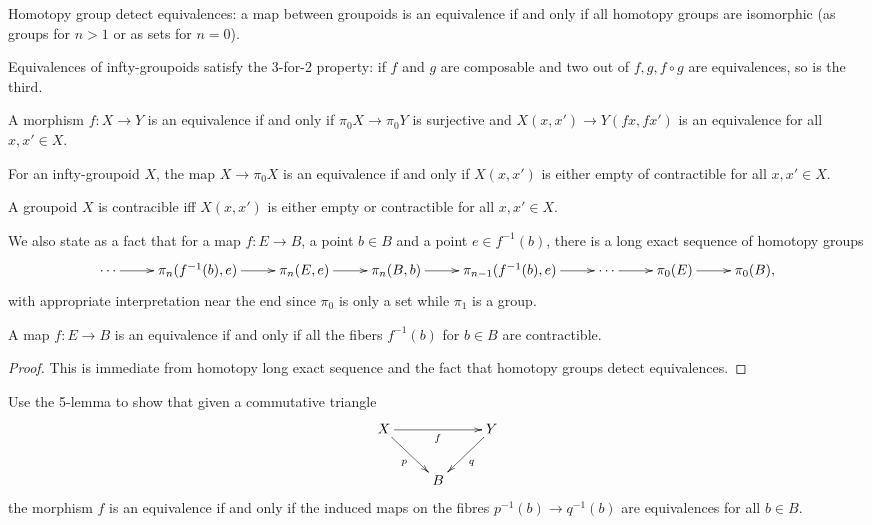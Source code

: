 Homotopy group detect equivalences:
a map between groupoids is an equivalence
if and only if all homotopy groups
are isomorphic (as groups for $n>1$ or
as sets for $n=0$).

\begin{lemma}
\label{lemma-equivalences-satisfy-3-for-2}
Equivalences of infty-groupoids
satisfy the 3-for-2 property:
if  $f$ and $g$ are composable and two
out of $f,g,f \circ g$ are equivalences,
so is the third.
\end{lemma}

\begin{lemma}
\label{lemma-equiv-iff-equiv-path-space}
A morphism $f:X\to Y$ is an equivalence if
and only if
$\pi_0 X \to \pi_0Y$ is surjective
and $X(x,x') \to Y(fx,fx')$ is an equivalence
for all $x,x' \in X$.
\end{lemma}

\begin{lemma}
\label{lemma-equiv-iff-path-space-contr}
For an  infty-groupoid $X$,
the map $X \to \pi_0X$ is an equivalence if
and only if
$X(x,x')$ is either empty of contractible for
all $x,x' \in X$.
\end{lemma}

\begin{lemma}
\label{lemma-group-contr-iff-path-space}
A groupoid $X$ is contracible iff $X(x,x')$
is either empty or
contractible for all $x,x' \in X$.
\end{lemma}

\medskip\noindent
We also state as a fact that
for a map $f:E \to B$, a point $b \in B$ and
a point $e \in f^{-1}(b)$,
there is a long exact sequence of homotopy
groups
$$
\xymatrix{
\cdots\ar[r]&\pi_n(f^{-1}(b),e)\ar[r]&
\pi_n(E,e)\ar[r]&\pi_n(B,b)\ar[r]&
\pi_{n-1}(f^{-1}(b),e)\ar[r]&\cdots
\ar[r]&\pi_0(E)\ar[r]&\pi_0(B),
}
$$
with appropriate interpretation near the end
since
$\pi_0$ is only a set while $\pi_1$ is a
group.

\begin{proposition}
\label{proposition-map-equiv-iff-fiber}
A map $f:E \to B$ is an equivalence if and
only if
all the fibers $f^{-1}(b)$ for $b \in B$ are
contractible.
\end{proposition}

\begin{proof}
This is immediate from homotopy long exact
sequence
and the fact that homotopy groups detect
equivalences.
\end{proof}

\begin{exercise}[2.2]
\label{exercise-2.2}
Use the 5-lemma to show that given a
commutative triangle
$$
\xymatrix{
X \ar[rd]_{p} \ar[rr]_{f} && Y \ar[dl]^{q} \\
& B
}
$$
the morphism $f$ is an equivalence if and
only if
the induced maps on the fibres
$p^{-1}(b)\to q^{-1}(b)$ are equivalences for
all $b \in B$.
\end{exercise}

